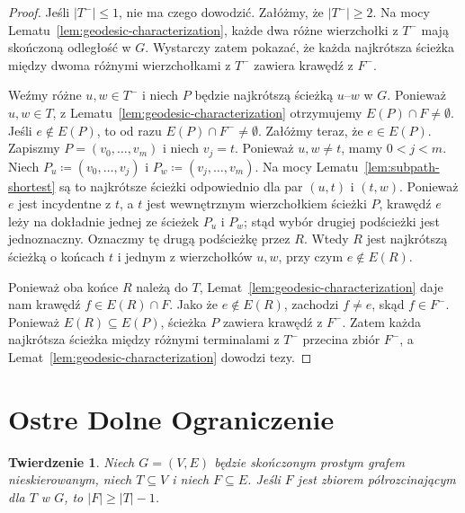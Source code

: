 \documentclass[11pt,a4paper]{amsart}
\theoremstyle{definition}
\theoremstyle{plain}
\newtheorem{theorem}[definition]{Twierdzenie}
\begin{document}
\begin{proof}
Jeśli $|T^-|\le 1$, nie ma czego dowodzić. Załóżmy, że $|T^-|\ge 2$. Na mocy Lematu~\ref{lem:geodesic-characterization}, każde dwa różne wierzchołki z $T^-$ mają skończoną odległość w $G$. Wystarczy zatem pokazać, że każda najkrótsza ścieżka między dwoma różnymi wierzchołkami z $T^-$ zawiera krawędź z $F^-$.

Weźmy różne $u,w\in T^-$ i niech $P$ będzie najkrótszą ścieżką $u$--$w$ w $G$. Ponieważ $u,w\in T$, z Lematu~\ref{lem:geodesic-characterization} otrzymujemy $E(P)\cap F\neq\emptyset$. Jeśli $e\notin E(P)$, to od razu $E(P)\cap F^-\neq\emptyset$. Załóżmy teraz, że $e\in E(P)$. Zapiszmy $P=(v_0,\dots,v_m)$ i niech $v_j=t$. Ponieważ $u,w\neq t$, mamy $0<j<m$. Niech $P_u\coloneqq (v_0,\dots,v_j)$ i $P_w\coloneqq (v_j,\dots,v_m)$. Na mocy Lematu~\ref{lem:subpath-shortest} są to najkrótsze ścieżki odpowiednio dla par $(u,t)$ i $(t,w)$. Ponieważ $e$ jest incydentne z $t$, a $t$ jest wewnętrznym wierzchołkiem ścieżki $P$, krawędź $e$ leży na dokładnie jednej ze ścieżek $P_u$ i $P_w$; stąd wybór drugiej podścieżki jest jednoznaczny. Oznaczmy tę drugą podścieżkę przez $R$. Wtedy $R$ jest najkrótszą ścieżką o końcach $t$ i jednym z wierzchołków $u,w$, przy czym $e\notin E(R)$.

Ponieważ oba końce $R$ należą do $T$, Lemat~\ref{lem:geodesic-characterization} daje nam krawędź $f\in E(R)\cap F$. Jako że $e\notin E(R)$, zachodzi $f\neq e$, skąd $f\in F^-$. Ponieważ $E(R)\subseteq E(P)$, ścieżka $P$ zawiera krawędź z $F^-$. Zatem każda najkrótsza ścieżka między różnymi terminalami z $T^-$ przecina zbiór $F^-$, a Lemat~\ref{lem:geodesic-characterization} dowodzi tezy.
\end{proof}

\section{Ostre Dolne Ograniczenie}

\begin{theorem}\label{thm:main}
Niech $G=(V,E)$ będzie skończonym prostym grafem nieskierowanym, niech $T\subseteq V$ i niech $F\subseteq E$. Jeśli $F$ jest zbiorem półrozcinającym dla $T$ w $G$, to $|F|\ge |T|-1$.
\end{theorem}
\end{document}
